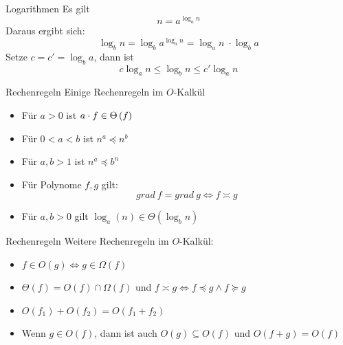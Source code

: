 \begin{frame}{Logarithmen}
	Es gilt $$n = a^{\log_a n}$$ \pause
	Daraus ergibt sich: $$ \log_b n = \log_b a^{\log_a n} = \log_a n \; \cdot \log_b a $$ \pause 
	Setze $c = c' = \log_b a$, dann ist $$c \log_a n \leq \log_b n \leq c' \log_a n$$
\end{frame}

\begin{frame}{Rechenregeln}
	Einige Rechenregeln im $O$-Kalkül
	\begin{itemize}[<+->]
		\item Für $a > 0$ ist $a \cdot f \in \Theta\left(f\right)$ 
		\item Für $0 < a < b$ ist $n^a \preceq n^b$
		\item Für $a,b > 1$ ist $n^a \preceq b^n$
		\item Für Polynome $f,g$ gilt: $$grad \ f = grad \ g \iff f \asymp g $$
		\item Für $a,b > 0$ gilt $\log_a(n) \in \Theta(\log_b n)$ 
	\end{itemize}
\end{frame}


\begin{frame}{Rechenregeln}
	Weitere Rechenregeln im $O$-Kalkül:
	\begin{itemize}[<+->]
		\item $f \in O(g) \iff g \in \Omega(f)$
		\item $\Theta(f) = O(f) \cap \Omega(f)$ und $f \asymp g \iff f \preceq g \wedge f \succeq g$ 
		\item $O(f_1) + O(f_2) = O(f_1 + f_2)$
		\item Wenn $g \in O(f)$, dann ist auch $O(g) \subseteq O(f)$ und $O(f + g) = O(f)$
	\end{itemize}
	
\end{frame}


